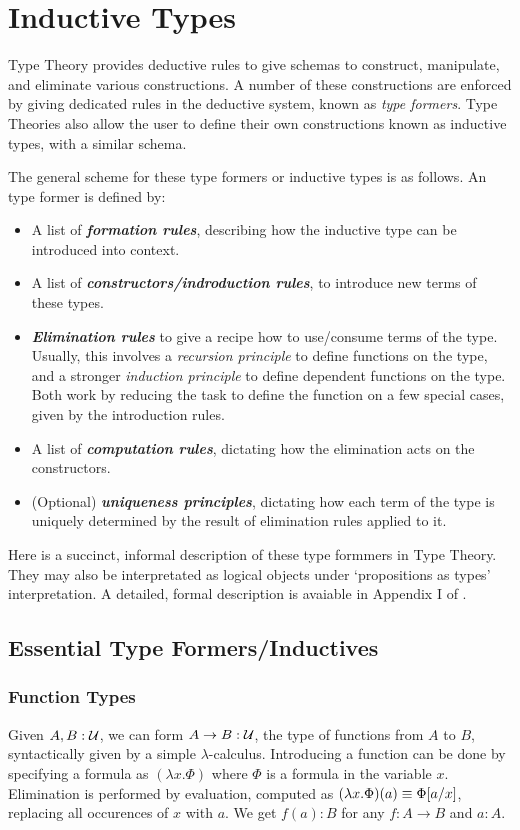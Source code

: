 \section{Inductive Types}
Type Theory provides deductive rules to give schemas to construct, manipulate, and
eliminate various constructions. A number of these
constructions are enforced by giving dedicated rules in the deductive system, known as \textit{type formers}.
Type Theories also allow the user to define their own constructions known as inductive types,
with a similar schema.

The general scheme for these type formers or inductive types is as follows. An type former is defined by:
\begin{itemize}
  \item A list of \textbf{\textit{formation rules}}, describing how the inductive type can be
    introduced into context.
\item A list of \textbf{\textit{constructors/indroduction rules}}, to introduce new terms of these types.
\item \textbf{\textit{Elimination rules}} to give a recipe how to use/consume terms of the type. 
    Usually, this involves a \textit{recursion principle} to define functions on the type, and a
    stronger \textit{induction principle} to define dependent functions on the type.
    Both work by reducing the task to define the function on a few special cases, given by the introduction rules.
\item A list of \textbf{\textit{computation rules}}, dictating how the elimination acts on the constructors. 
\item (Optional) \textbf{\textit{uniqueness principles}}, dictating how each term of the type
  is uniquely determined by the result of elimination rules applied to it.
\end{itemize}

Here is a succinct, informal description of these type formmers in Type Theory. They may also be interpretated as logical objects 
under `propositions as types' interpretation. A detailed, formal description
is avaiable in Appendix I of \cite{HoTT}.

\subsection{Essential Type Formers/Inductives}
\subsubsection{Function Types}
Given $A, B : \mathcal{U}$, we can form $A \to B : \mathcal{U}$, the type of functions from $A$ to $B$,
syntactically given by a simple $\lambda$-calculus. Introducing a function can be done by specifying a 
formula as $(\lambda x.\Phi)$ where $\Phi$ is a formula in the variable $x$. Elimination is performed by
evaluation, computed as $(\lambda x.\Phi)(a) \equiv \Phi[a/x]$, replacing all occurences of $x$ with $a$.
We get $f(a) : B$ for any $f : A \to B$ and $a : A$.

